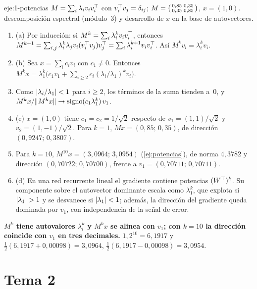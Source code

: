 \begin{solucion}{eje:1-potencias}
\datos $M=\sum_i\lambda_iv_iv_i^{\top}$ con $v_i^{\top} v_j=\delta_{ij}$; $M=\begin{psmallmatrix}0{,}85&0{,}35\\0{,}35&0{,}85\end{psmallmatrix}$, $x=(1,0)$.
\planteamiento descomposición espectral (módulo~3) y desarrollo de $x$ en la base de autovectores.
\pasos
\begin{enumerate}[label=\arabic*.]
  \item (a) Por inducción: si $M^{k}=\sum_i\lambda_i^{k}v_iv_i^{\top}$, entonces $M^{k+1}=\sum_{i,j}\lambda_i^{k}\lambda_jv_i(v_i^{\top} v_j)v_j^{\top}=\sum_i\lambda_i^{k+1}v_iv_i^{\top}$. Así $M^{k}v_i=\lambda_i^{k}v_i$.
  \item (b) Sea $x=\sum_ic_iv_i$ con $c_1\ne 0$. Entonces $M^{k}x=\lambda_1^{k}\bigl(c_1v_1+\sum_{i\ge 2}c_i(\lambda_i/\lambda_1)^{k}v_i\bigr)$.
  \item Como $\lvert\lambda_i/\lambda_1\rvert<1$ para $i\ge 2$, los términos de la suma tienden a~0, y $M^{k}x/\lVert M^{k}x\rVert\to\operatorname{signo}(c_1\lambda_1^{k})\,v_1$.
  \item (c) $x=(1,0)$ tiene $c_1=c_2=1/\sqrt2$ respecto de $v_1=(1,1)/\sqrt2$ y $v_2=(1,-1)/\sqrt2$. Para $k=1$, $Mx=(0{,}85;\,0{,}35)$, de dirección $(0{,}9247;\,0{,}3807)$.
  \item Para $k=10$, $M^{10}x=(3{,}0964;\,3{,}0954)$ (\cref{ej:potencias}), de norma $4{,}3782$ y dirección $(0{,}70722;\,0{,}70700)$, frente a $v_1=(0{,}70711;\,0{,}70711)$.
  \item (d) En una red recurrente lineal el gradiente contiene potencias $(W^{\top})^{k}$. Su componente sobre el autovector dominante escala como $\lambda_1^{k}$, que explota si $\lvert\lambda_1\rvert>1$ y se desvanece si $\lvert\lambda_1\rvert<1$; además, la dirección del gradiente queda dominada por $v_1$, con independencia de la señal de error.
\end{enumerate}
\resultado \textbf{$M^{k}$ tiene autovalores $\lambda_i^{k}$ y $M^{k}x$ se alinea con $v_1$; con $k=10$ la dirección coincide con $v_1$ en tres decimales.}
\comprobacion $1{,}2^{10}=6{,}1917$ y $\tfrac12(6{,}1917+0{,}00098)=3{,}0964$, $\tfrac12(6{,}1917-0{,}00098)=3{,}0954$.
\end{solucion}

\section{Tema 2}

